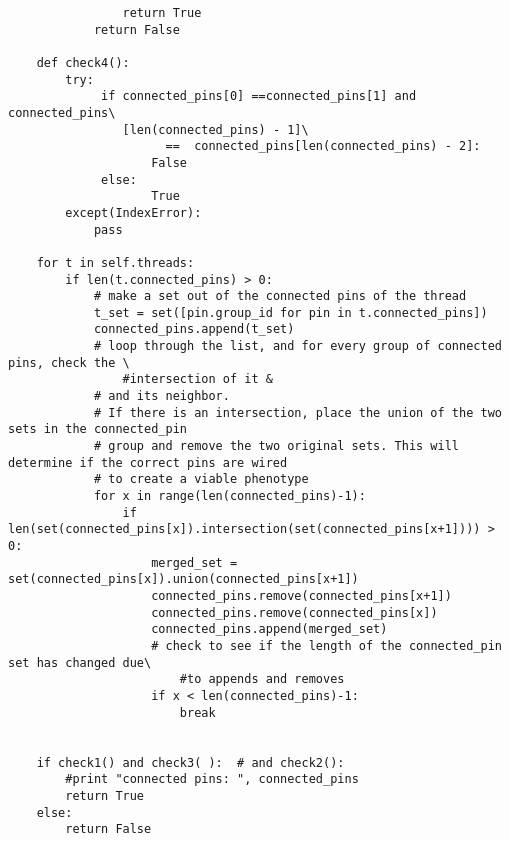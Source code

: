 \documentclass[a4paper]{article}
\begin{document}
\begin{verbatim}
                return True
            return False

    def check4():
        try:
             if connected_pins[0] ==connected_pins[1] and connected_pins\
                [len(connected_pins) - 1]\
                      ==  connected_pins[len(connected_pins) - 2]: 
                    False
             else:
                    True
        except(IndexError):
            pass

    for t in self.threads:
        if len(t.connected_pins) > 0:
            # make a set out of the connected pins of the thread
            t_set = set([pin.group_id for pin in t.connected_pins])
            connected_pins.append(t_set)
            # loop through the list, and for every group of connected pins, check the \
                #intersection of it &
            # and its neighbor.
            # If there is an intersection, place the union of the two sets in the connected_pin
            # group and remove the two original sets. This will determine if the correct pins are wired
            # to create a viable phenotype
            for x in range(len(connected_pins)-1):
                if len(set(connected_pins[x]).intersection(set(connected_pins[x+1]))) > 0:
                    merged_set = set(connected_pins[x]).union(connected_pins[x+1])
                    connected_pins.remove(connected_pins[x+1])
                    connected_pins.remove(connected_pins[x])
                    connected_pins.append(merged_set)
                    # check to see if the length of the connected_pin set has changed due\
                        #to appends and removes
                    if x < len(connected_pins)-1:
                        break


    if check1() and check3( ):  # and check2():
        #print "connected pins: ", connected_pins
        return True
    else:
        return False
\end{verbatim}
\end{document}

